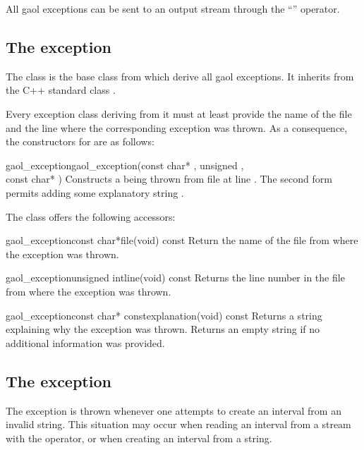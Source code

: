 \documentclass{manual}
\begin{document}
All gaol exceptions can be sent to an output stream through the ``\code{<{}<}''
operator.

\subsection{The  exception}\label{sec:gaol_exception}
The  class is the base class from which derive all
gaol exceptions. It inherits from the C++ standard class .

Every exception class deriving from it must at least provide the name of
the file and the line where the corresponding exception was thrown. As a
consequence, the constructors for  are as follows:

\begin{defmethod}{gaol\_exception}{}{gaol\_exception}{(const char* , unsigned , \\\hbox{}\hfill const char* )}
Constructs a  being thrown from file  at
line . The second form permits adding some explanatory string .
\end{defmethod}

\noindent
The class offers the following accessors:

\begin{defmethod}{gaol\_exception}{const char*}{file}{(void) const}
  Return the name of the file from where the exception was thrown.
\end{defmethod}

\begin{defmethod}{gaol\_exception}{unsigned int}{line}{(void) const}
  Returns the line number in the file from where the exception was thrown.
\end{defmethod}

\begin{defmethod}{gaol\_exception}{const char* const}{explanation}{(void) const}
  Returns a string explaining why the exception was thrown. Returns an empty
  string if no additional information was provided.
\end{defmethod}

\subsection{The  exception}
The  exception is thrown whenever one attempts to
create an interval from an invalid string. This situation may occur when
reading an interval from a stream with the \code{>{}>} operator, or when
creating an interval from a string.
\end{document}
